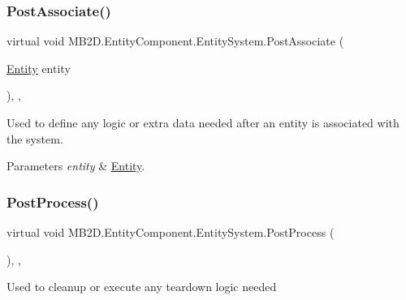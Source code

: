 \subsubsection{\texorpdfstring{Post\+Associate()}{PostAssociate()}}
{\footnotesize\ttfamily virtual void M\+B2\+D.\+Entity\+Component.\+Entity\+System.\+Post\+Associate (\begin{DoxyParamCaption}\item[{\hyperlink{class_m_b2_d_1_1_entity_component_1_1_entity}{Entity}}]{entity }\end{DoxyParamCaption})\hspace{0.3cm}{\ttfamily [inline]}, {\ttfamily [protected]}, {\ttfamily [virtual]}}



Used to define any logic or extra data needed after an entity is associated with the system. 


\begin{DoxyParams}{Parameters}
{\em entity} & \hyperlink{class_m_b2_d_1_1_entity_component_1_1_entity}{Entity}.\\
\hline
\end{DoxyParams}
\hypertarget{class_m_b2_d_1_1_entity_component_1_1_entity_system_aa215c796a01092b66eb70c5726dfac75}{}\label{class_m_b2_d_1_1_entity_component_1_1_entity_system_aa215c796a01092b66eb70c5726dfac75} 
\subsubsection{\texorpdfstring{Post\+Process()}{PostProcess()}}
{\footnotesize\ttfamily virtual void M\+B2\+D.\+Entity\+Component.\+Entity\+System.\+Post\+Process (\begin{DoxyParamCaption}{ }\end{DoxyParamCaption})\hspace{0.3cm}{\ttfamily [inline]}, {\ttfamily [protected]}, {\ttfamily [virtual]}}



Used to cleanup or execute any teardown logic needed 

\hypertarget{class_m_b2_d_1_1_entity_component_1_1_entity_system_aadc002dd04d9cb75775ca955a28e303e}{}\label{class_m_b2_d_1_1_entity_component_1_1_entity_system_aadc002dd04d9cb75775ca955a28e303e} 
